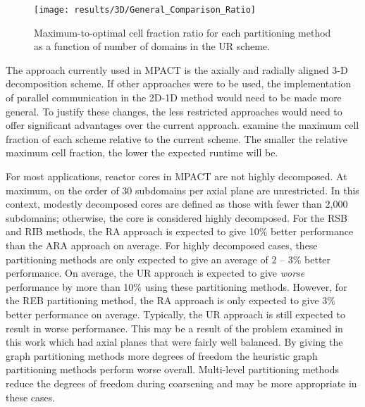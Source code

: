 {{{      \begin{figure}
        \centering
        \texttt{[image: results/3D/General\_Comparison\_Ratio]}
        \caption{Maximum-to-optimal cell fraction ratio for each partitioning method as a function of number of domains in the \acf{UR} scheme. \label{fig:Spatial Decomposition:3D U Max. to Optimal Cell Ratio}}
      \end{figure}

      The approach currently used in MPACT is the axially and radially aligned 3-D decomposition scheme.
      If other approaches were to be used, the implementation of parallel communication in the 2D-1D method would need to be made more general.
      To justify these changes, the less restricted approaches would need to offer significant advantages over the current approach.
       examine the maximum cell fraction of each scheme relative to the current scheme.
      The smaller the relative maximum cell fraction, the lower the expected runtime will be.

      For most applications, reactor cores in MPACT are not highly decomposed.
      At maximum, on the order of 30 subdomains per axial plane are unrestricted.
      In this context, modestly decomposed cores are defined as those with fewer than 2,000 subdomains; otherwise, the core is considered highly decomposed.
      For the \ac{RSB} and \ac{RIB} methods, the \ac{RA} approach is expected to give 10\% better performance than the \ac{ARA} approach on average.
      For highly decomposed cases, these partitioning methods are only expected to give an average of 2 -- 3\% better performance.
      On average, the \ac{UR} approach is expected to give \emph{worse} performance by more than 10\% using these partitioning methods.
      However, for the \ac{REB} partitioning method, the \ac{RA} approach is only expected to give 3\% better performance on average.
      Typically, the \ac{UR} approach is still expected to result in worse performance.
      This may be a result of the problem examined in this work which had axial planes that were fairly well balanced.
      By giving the graph partitioning methods more degrees of freedom the heuristic graph partitioning methods perform worse overall.
      Multi-level partitioning methods reduce the degrees of freedom during coarsening and may be more appropriate in these cases.

}}}
